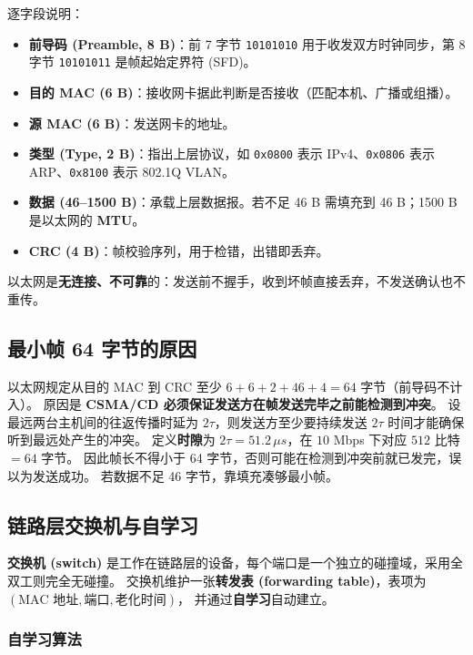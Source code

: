 逐字段说明：

\begin{itemize}
    \item \textbf{前导码 (Preamble, 8 B)}：前 7 字节 \texttt{10101010} 用于收发双方时钟同步，第 8 字节 \texttt{10101011} 是帧起始定界符 (SFD)。
    \item \textbf{目的 MAC (6 B)}：接收网卡据此判断是否接收（匹配本机、广播或组播）。
    \item \textbf{源 MAC (6 B)}：发送网卡的地址。
    \item \textbf{类型 (Type, 2 B)}：指出上层协议，如 \texttt{0x0800} 表示 IPv4、\texttt{0x0806} 表示 ARP、\texttt{0x8100} 表示 802.1Q VLAN。
    \item \textbf{数据 (46--1500 B)}：承载上层数据报。若不足 46 B 需填充到 46 B；1500 B 是以太网的 \textbf{MTU}。
    \item \textbf{CRC (4 B)}：帧校验序列，用于检错，出错即丢弃。
\end{itemize}

以太网是\textbf{无连接、不可靠}的：发送前不握手，收到坏帧直接丢弃，不发送确认也不重传。

\subsection{最小帧 64 字节的原因}

以太网规定从目的 MAC 到 CRC 至少 $6+6+2+46+4 = 64$ 字节（前导码不计入）。
原因是 \textbf{CSMA/CD 必须保证发送方在帧发送完毕之前能检测到冲突}。
设最远两台主机间的往返传播时延为 $2\tau$，则发送方至少要持续发送 $2\tau$ 时间才能确保听到最远处产生的冲突。
定义\textbf{时隙}为 $2\tau = 51.2\,\mu s$，在 $10$ Mbps 下对应 $512$ 比特 $=64$ 字节。
因此帧长不得小于 64 字节，否则可能在检测到冲突前就已发完，误以为发送成功。
若数据不足 46 字节，靠填充凑够最小帧。

\subsection{链路层交换机与自学习}

\textbf{交换机 (switch)} 是工作在链路层的设备，每个端口是一个独立的碰撞域，采用全双工则完全无碰撞。
交换机维护一张\textbf{转发表 (forwarding table)}，表项为 $(\text{MAC 地址}, \text{端口}, \text{老化时间})$，
并通过\textbf{自学习}自动建立。

\subsubsection{自学习算法}

